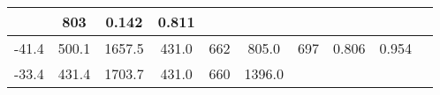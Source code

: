 \documentclass[a4paper,10pt]{article}
\begin{document}
\begin{longtable}{
     |
%    
    c|
%    
    c|
%    
    c|
%    
    c|
%    
    c|
%    
    c|
%    
    c|
%    
    c|
%    
    c|
%    
    c|
%    
    }
%        
        & 803
%        

%        

%        
        & 0.142
%        

%        

%        
        & 0.811
%        

%        
        \\
        \hline

        

%        

%        
        -41.4
%        

%        

%        
        & 500.1
%        

%        

%        
        & 1657.5
%        

%        

%        
        & 431.0
%        

%        

%        
        & 662
%        

%        

%        
        & 805.0
%        

%        

%        
        & 697
%        

%        

%        
        & 0.806
%        

%        

%        
        & 0.954
%        

%        
        \\
        \hline

        

%        

%        
        -33.4
%        

%        

%        
        & 431.4
%        

%        

%        
        & 1703.7
%        

%        

%        
        & 431.0
%        

%        

%        
        & 660
%        

%        

%        
        & 1396.0
%        

%        


\end{longtable}
\end{document}
